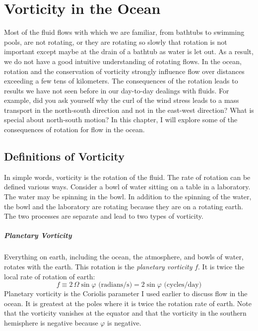 \chapter{Vorticity in the Ocean} 
Most of the fluid flows with which we are familiar, from bathtubs to
swimming pools, are not rotating, or they are rotating so slowly that
rotation is not important except maybe at the drain of a bathtub as
water is let out. As a result, we do not have a good intuitive
understanding of rotating flows. In the ocean, rotation and the
conservation of vorticity strongly influence flow over distances
exceeding a few tens of kilometers. The consequences of the rotation
leads to results we have not seen before in our day-to-day dealings
with fluids.  For example, did you ask yourself why the curl of the
wind stress leads to a mass
transport in the north-south direction and not
in the east-west direction? What is special about north-south motion?
In this chapter, I will explore some of the consequences of rotation
for flow in the ocean.

\section{Definitions of Vorticity}
In simple words, vorticity is the rotation of the
fluid. The rate of rotation can be defined various ways. Consider a
bowl of water sitting on a table in a laboratory. The water may be
spinning in the bowl. In addition to the spinning of the water, the
bowl and the laboratory are rotating because they are on a rotating
earth. The two processes are separate and lead to two types of
vorticity.

\paragraph{Planetary Vorticity}
Everything on earth, including the ocean, the atmosphere, and bowls of
water, rotates with the earth. This rotation is the \textit{planetary
  vorticity} $f$. It is twice the
local rate of rotation of earth:
\begin{equation}
\boxed{f \equiv 2\,\Omega \sin \varphi \,\, \text{(radians/s)} = 2 \sin \varphi
\,\, \text{(cycles/day)}}
\end{equation}
Planetary vorticity is the Coriolis parameter I used earlier to discuss flow in the ocean. It is
greatest at the poles where it is twice the rotation rate of
earth. Note that the vorticity vanishes at the equator and that the
vorticity in the southern hemisphere is negative because $\varphi$ is
negative.


